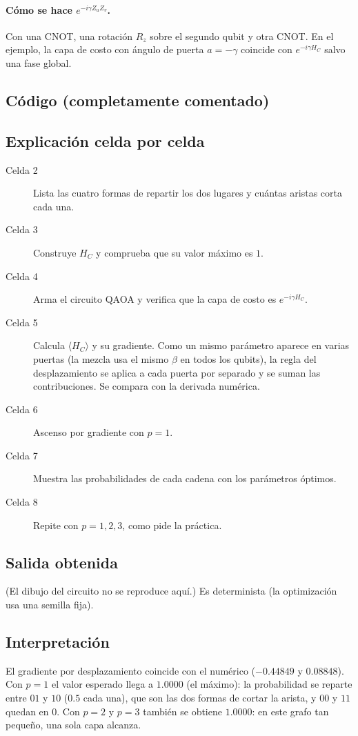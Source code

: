 \paragraph{Cómo se hace $e^{-i\gamma Z_uZ_v}$.} Con una CNOT, una rotación
$R_z$ sobre el segundo qubit y otra CNOT. En el ejemplo, la capa de costo con
ángulo de puerta $a=-\gamma$ coincide con $e^{-i\gamma H_C}$ salvo una fase
global.

\subsection{Código (completamente comentado)}


\subsection{Explicación celda por celda}
\begin{description}
  \item[Celda 2] Lista las cuatro formas de repartir los dos lugares y cuántas
    aristas corta cada una.
  \item[Celda 3] Construye $H_C$ y comprueba que su valor máximo es $1$.
  \item[Celda 4] Arma el circuito QAOA y verifica que la capa de costo es
    $e^{-i\gamma H_C}$.
  \item[Celda 5] Calcula $\langle H_C\rangle$ y su gradiente. Como un mismo
    parámetro aparece en varias puertas (la mezcla usa el mismo $\beta$ en todos
    los qubits), la regla del desplazamiento se aplica a cada puerta por separado y se suman
    las contribuciones. Se compara con la derivada numérica.
  \item[Celda 6] Ascenso por gradiente con $p=1$.
  \item[Celda 7] Muestra las probabilidades de cada cadena con los parámetros
    óptimos.
  \item[Celda 8] Repite con $p=1,2,3$, como pide la práctica.
\end{description}

\subsection{Salida obtenida}

(El dibujo del circuito no se reproduce aquí.) Es determinista (la
optimización usa una semilla fija).

\subsection{Interpretación}
El gradiente por desplazamiento coincide con el numérico
($-0.44849$ y $0.08848$). Con $p=1$ el valor esperado llega a $1.0000$ (el
máximo): la probabilidad se reparte entre $01$ y $10$ ($0.5$ cada una), que son
las dos formas de cortar la arista, y $00$ y $11$ quedan en $0$. Con $p=2$ y
$p=3$ también se obtiene $1.0000$: en este grafo tan pequeño, una sola capa
alcanza.

